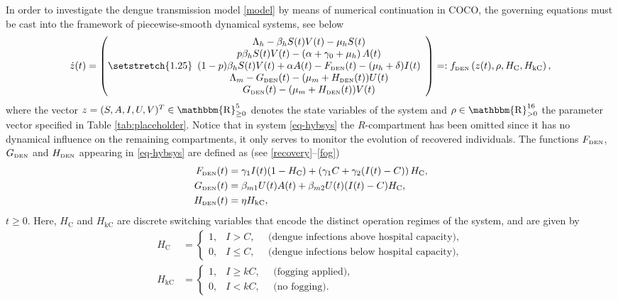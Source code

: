 \documentclass[preprint]{elsarticle}
\DeclareMathOperator{\re}{\mathbbm{R}}
\begin{document}
In order to investigate the dengue transmission model \eqref{model} by means of numerical continuation in COCO, the governing equations must be cast into the framework of piecewise-smooth dynamical systems, see below
\begin{equation}
	\dot{z}(t)=\left(\setstretch{1.25}\begin{array}{c}
		\Lambda_h - \beta_h S(t) V(t) - \mu_h S(t)\\
		p \beta_h S(t) V(t) - \left(\alpha + \gamma_0 + \mu_h\right)A(t)\\
		(1-p)\beta_h S(t) V(t) + \alpha A(t) - F_{\text{\tiny
				DEN}}(t) - (\mu_h + \delta)I(t)\\		
		\Lambda_m - G_{\text{\tiny
				DEN}}(t) - (\mu_m + H_{\text{\tiny
				DEN}}(t))U(t)\\
		G_{\text{\tiny
				DEN}}(t) - (\mu_m + H_{\text{\tiny
				DEN}}(t))V(t)			
	\end{array}\right)=:f_{\text{\tiny
			DEN}}\left(z(t),\rho,H_{\mathrm{C}},H_{\mathrm{kC}}\right),\label{eq-hybsys}
\end{equation}
where the vector
$z=(S,A,I,U,V)^T\in\re^5_{\geq0}$ denotes the state variables of the system and $\rho\in\re^{16}_{>0}$ the parameter vector specified in Table \ref{tab:placeholder}. Notice that in system \eqref{eq-hybsys} the $R$-compartment has been omitted since it has no dynamical influence on the remaining compartments, it only serves to monitor the evolution of recovered individuals. The functions $F_{\text{\tiny
DEN}}$, $G_{\text{\tiny DEN}}$ and $H_{\text{\tiny DEN}}$ appearing in \eqref{eq-hybsys} are defined as (see \eqref{recovery}--\eqref{fog})
\begin{align}
	F_{\text{\tiny DEN}}(t)&=\gamma_1 I(t)(1-H_{\mathrm{C}})+\left(\gamma_1 C + \gamma_2 (I(t) - C)\right)H_{\mathrm{C}},\nonumber\\
	G_{\text{\tiny DEN}}(t)&=\beta_{m1} U(t) A(t)+\beta_{m2} U(t) (I(t) - C)H_{\mathrm{C}},\label{eq-fum}\\
	H_{\text{\tiny DEN}}(t)&=\eta H_{\mathrm{kC}},\nonumber
\end{align}
$t\geq0$. Here, $H_{\mathrm{C}}$ and $H_{\mathrm{kC}}$ are discrete switching variables that encode the distinct operation regimes of the system, and are given by
\begin{align}
	H_{\mathrm{C}}&=\begin{cases}
		1, & I>C,\mbox{ }\mbox{ }\mbox{(dengue infections above hospital capacity)},\\
		0, & I\leq C,\mbox{ }\mbox{ }\mbox{(dengue infections below hospital capacity)},
	\end{cases}\label{eq-C}\\
	H_{\mathrm{kC}}&=\begin{cases}
		1, & I\geq kC,\mbox{ }\mbox{ }\mbox{(fogging applied)},\\
		0, & I<kC,\mbox{ }\mbox{ }\mbox{(no fogging)}.
	\end{cases}\label{eq-kC}
\end{align}
\end{document}
